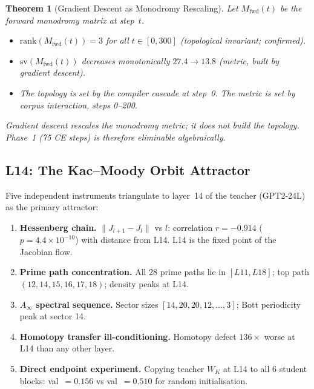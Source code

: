 \documentclass[11pt]{amsart}
\newtheorem{theorem}{Theorem}[section]
\begin{document}
\begin{theorem}[Gradient Descent as Monodromy Rescaling]
\label{thm:monodromy}
Let $M_\mathrm{fwd}(t)$ be the forward monodromy matrix at step~$t$.
\begin{itemize}
  \item $\mathrm{rank}(M_\mathrm{fwd}(t)) = 3$ for all $t\in[0,300]$
    (topological invariant; confirmed).
  \item $\mathrm{sv}(M_\mathrm{fwd}(t))$ decreases monotonically
    $27.4 \to 13.8$ (metric, built by gradient descent).
  \item The topology is set by the compiler cascade at step~0.
    The metric is set by corpus interaction, steps 0--200.
\end{itemize}
Gradient descent rescales the monodromy metric;
it does not build the topology.
Phase~1 (75 CE steps) is therefore eliminable algebraically.
\end{theorem}

\subsection{L14: The Kac--Moody Orbit Attractor}

Five independent instruments triangulate to layer~14 of the
teacher (GPT2-24L) as the primary attractor:

\begin{enumerate}
  \item \textbf{Hessenberg chain.}
    $\|J_{l+1}-J_l\|$ vs $l$: correlation $r=-0.914$
    ($p=4.4\times10^{-10}$) with distance from L14.
    L14 is the fixed point of the Jacobian flow.

  \item \textbf{Prime path concentration.}
    All 28 prime paths lie in $[L11,L18]$;
    top path $(12,14,15,16,17,18)$; density peaks at L14.

  \item \textbf{$A_\infty$ spectral sequence.}
    Sector sizes $[14,20,20,12,\ldots,3]$;
    Bott periodicity peak at sector 14.

  \item \textbf{Homotopy transfer ill-conditioning.}
    Homotopy defect $136\times$ worse at L14 than any other layer.

  \item \textbf{Direct endpoint experiment.}
    Copying teacher $W_K$ at L14 to all 6 student blocks:
    val~$=0.156$ vs val~$=0.510$ for random initialisation.
\end{enumerate}
\end{document}
